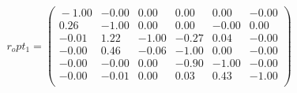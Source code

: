 \documentclass[10pt,a4paper]{article}
\begin{document}
 \begin{equation*} r_opt_1  =  %
\begin{pmatrix}{}
  -1.00 & -0.00 & 0.00 & 0.00 & 0.00 & -0.00 \\ 
  0.26 & -1.00 & 0.00 & 0.00 & -0.00 & 0.00 \\ 
  -0.01 & 1.22 & -1.00 & -0.27 & 0.04 & -0.00 \\ 
  -0.00 & 0.46 & -0.06 & -1.00 & 0.00 & -0.00 \\ 
  -0.00 & -0.00 & 0.00 & -0.90 & -1.00 & -0.00 \\ 
  -0.00 & -0.01 & 0.00 & 0.03 & 0.43 & -1.00 \\ 
  \end{pmatrix}
 \end{equation*} 
\end{document}
